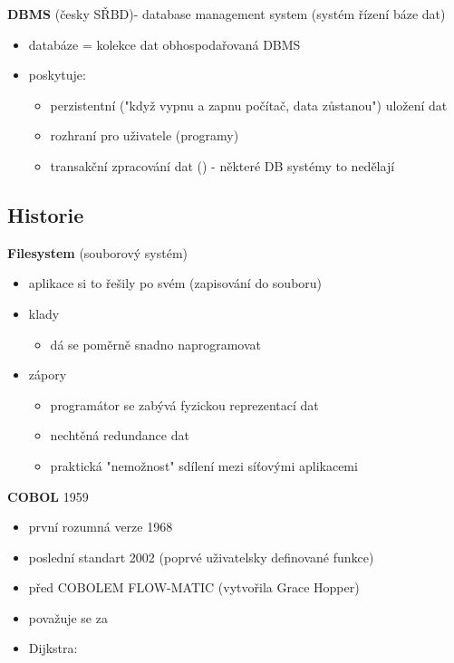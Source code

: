 \documentclass[10pt, a4paper, titlepage]{article}
\theoremstyle{note}
\begin{document}
\textbf{DBMS} (česky SŘBD)- database management system (systém řízení báze dat)
\begin{itemize}	
	\item databáze = kolekce dat obhospodařovaná DBMS
	\item poskytuje:
	\begin{itemize}
		\item perzistentní ("když vypnu a zapnu počítač, data zůstanou") uložení dat
		\item rozhraní pro uživatele (programy)
		\item transakční zpracování dat () - některé DB systémy to nedělají
	\end{itemize}
\end{itemize}		 


\subsection{Historie}

\textbf{Filesystem} (souborový systém)
\begin{itemize}
	\item aplikace si to řešily po svém (zapisování do souboru)
	\item klady
	\begin{itemize}
		\item dá se poměrně snadno naprogramovat
	\end{itemize}		 
	\item zápory
	\begin{itemize}
		\item programátor se zabývá fyzickou reprezentací dat
		\item nechtěná redundance dat
		\item praktická "nemožnost" sdílení mezi síťovými aplikacemi
	\end{itemize}
\end{itemize}

\textbf{COBOL} 1959
\begin{itemize}
	\item první rozumná verze 1968
	\item poslední standart 2002 (poprvé uživatelsky definované funkce)
	\item před COBOLEM FLOW-MATIC (vytvořila Grace Hopper)
	\item považuje se za 
	\item Dijkstra: 
\end{itemize}
\end{document}
